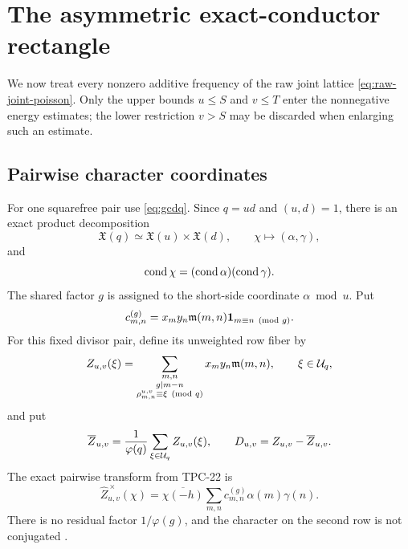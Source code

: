 \section{The asymmetric exact-conductor rectangle}
\label{sec:asymmetric-conductor}

We now treat every nonzero additive frequency of the raw joint lattice
\eqref{eq:raw-joint-poisson}.  Only the upper bounds \(u\le S\) and
\(v\le T\) enter the nonnegative energy estimates; the lower
restriction \(v>S\) may be discarded when enlarging such an estimate.

\subsection{Pairwise character coordinates}

For one squarefree pair use \eqref{eq:gcdq}.  Since \(q=ud\) and
\((u,d)=1\), there is an exact product decomposition
\begin{equation}
 \mathfrak X(q)\simeq\mathfrak X(u)\times\mathfrak X(d),
 \qquad \chi\longmapsto(\alpha,\gamma),
 \label{eq:asym-product-characters}
\end{equation}
and
\begin{equation}
 \operatorname{cond}\chi=(\operatorname{cond}\alpha)(\operatorname{cond}\gamma).
 \label{eq:asym-product-conductors}
\end{equation}
The shared factor \(g\) is assigned to the short-side coordinate
\(\alpha\bmod u\).  Put
\begin{equation}
 c_{m,n}^{(g)}
 =x_my_n\mathfrak m(m,n)\mathbf 1_{m\equiv n\pmod g}.
 \label{eq:asym-compatibility-matrix}
\end{equation}
For this fixed divisor pair, define its unweighted row fiber by
\begin{equation}
 Z_{u,v}(\xi)=
 \sum_{\substack{m,n\\g\mid m-n\\
                  \rho_{m,n}^{u,v}\equiv\xi\pmod q}}
 x_my_n\mathfrak m(m,n),
 \qquad \xi\in\mathcal U_q,
 \label{eq:pair-row-fiber}
\end{equation}
and put
\begin{equation}
 \overline Z_{u,v}
 =\frac1{\varphi(q)}\sum_{\xi\in\mathcal U_q}Z_{u,v}(\xi),
 \qquad D_{u,v}=Z_{u,v}-\overline Z_{u,v}.
 \label{eq:pair-row-centering}
\end{equation}
The exact pairwise transform from TPC-22 is
\begin{equation}
 \widehat Z_{u,v}^{\,\times}(\chi)
 =\overline{\chi(-h)}
 \sum_{m,n}c_{m,n}^{(g)}\alpha(m)\gamma(n).
 \label{eq:asym-rectangularization}
\end{equation}
There is no residual factor \(1/\varphi(g)\), and the character on the
second row is not conjugated \citep{WangTPC22}.

